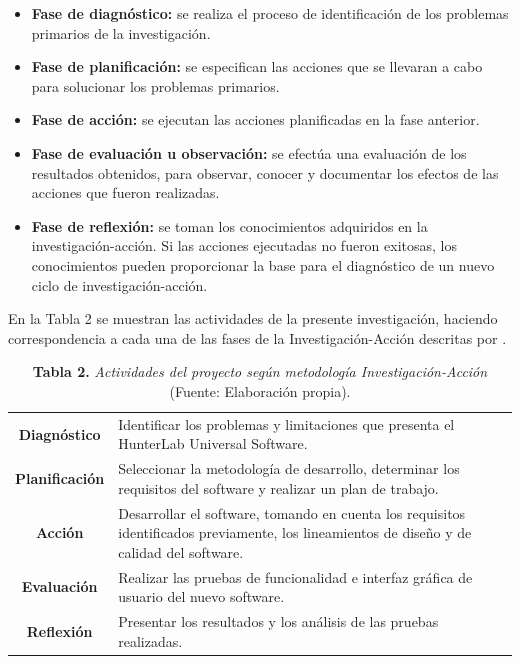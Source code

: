 	\begin{itemize}
		\item \textbf{Fase de diagn\'{o}stico:} se realiza el proceso de identificaci\'{o}n de los problemas primarios de la investigaci\'{o}n.
		\item \textbf{Fase de planificaci\'{o}n:} se especifican las acciones que se llevaran a cabo para solucionar los problemas primarios.
		\item \textbf{Fase de acci\'{o}n:} se ejecutan las acciones planificadas en la fase anterior.
		\item \textbf{Fase de evaluaci\'{o}n u observaci\'{o}n:} se efect\'{u}a una evaluaci\'{o}n de los resultados obtenidos, para observar, conocer y documentar los efectos de las acciones que fueron realizadas.
		\item \textbf{Fase de reflexi\'{o}n:} se toman los conocimientos adquiridos en la investigaci\'{o}n-acci\'{o}n. Si las acciones ejecutadas no fueron exitosas, los conocimientos pueden proporcionar la base para el diagn\'{o}stico de un nuevo ciclo de investigaci\'{o}n-acci\'{o}n.
	\end{itemize}

En la Tabla 2 se muestran las actividades de la presente investigaci\'{o}n, haciendo correspondencia a cada una de las fases de la Investigaci\'{o}n-Acci\'{o}n descritas por \cite{Baskerville}.

\FloatBarrier %
\vline
	\begin{table}[htb]
		\small
		\centering
		\setlength{\extrarowheight}{5pt}
		\begin{tabulary}{15cm}{|c|L|}
			\hline
			 & \\ \hline
			\textbf{Diagn\'{o}stico} & Identificar los problemas y limitaciones que presenta el HunterLab Universal Software.\\ \hline
			\textbf{Planificaci\'{o}n} & Seleccionar la metodolog\'{i}a de desarrollo, determinar los requisitos del software y realizar un plan de trabajo.
\\ \hline
			\textbf{Acci\'{o}n} & Desarrollar el software, tomando en cuenta los requisitos identificados previamente, los lineamientos de dise\~{n}o y de calidad del software.\\ \hline
			\textbf{Evaluaci\'{o}n} & Realizar las pruebas de funcionalidad e interfaz gr\'{a}fica de usuario del nuevo software.\\ \hline
			\textbf{Reflexi\'{o}n} & Presentar los resultados y los an\'{a}lisis de las pruebas realizadas.\\ \hline
		\end{tabulary}
		\caption{\textbf{Tabla 2.} \textit{Actividades del proyecto seg\'{u}n metodolog\'{i}a Investigaci\'{o}n-Acci\'{o}n} (Fuente: Elaboraci\'{o}n propia).}
	\end{table}
\FloatBarrier %

